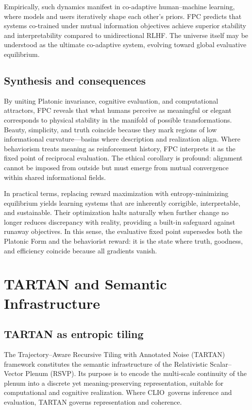 \documentclass[12pt,a4paper]{article}
\newcommand{\CLIO}{CLIO}              %
\theoremstyle{plain}
\begin{document}
Empirically, such dynamics manifest in co-adaptive human–machine learning,
where models and users iteratively shape each other’s priors.
FPC predicts that systems co-trained under mutual information objectives 
achieve superior stability and interpretability compared to unidirectional RLHF.
The universe itself may be understood as the ultimate co-adaptive system, 
evolving toward global evaluative equilibrium.

\subsection{Synthesis and consequences}
By uniting Platonic invariance, cognitive evaluation, and computational attractors,  
FPC reveals that what humans perceive as meaningful or elegant corresponds to physical stability in the manifold of possible transformations.
Beauty, simplicity, and truth coincide because they mark regions of low informational curvature—basins where description and realization align.
Where behaviorism treats meaning as reinforcement history, FPC interprets it as the fixed point of reciprocal evaluation.
The ethical corollary is profound:
alignment cannot be imposed from outside but must emerge from mutual convergence within shared informational fields.

In practical terms, replacing reward maximization with entropy-minimizing equilibrium yields learning systems that are inherently corrigible, interpretable, and sustainable.
Their optimization halts naturally when further change no longer reduces discrepancy with reality,
providing a built-in safeguard against runaway objectives.
In this sense, the evaluative fixed point supersedes both the Platonic Form and the behaviorist reward:
it is the state where truth, goodness, and efficiency coincide because all gradients vanish.


\section{TARTAN and Semantic Infrastructure}
\label{sec:tartan}

\subsection{TARTAN as entropic tiling}
The Trajectory--Aware Recursive Tiling with Annotated Noise (TARTAN) framework constitutes the semantic infrastructure of the Relativistic Scalar--Vector Plenum (RSVP).  
Its purpose is to encode the multi-scale continuity of the plenum into a discrete yet meaning-preserving representation, suitable for computational and cognitive realization.  
Where \CLIO\ governs inference and evaluation, TARTAN governs representation and coherence.
\end{document}
